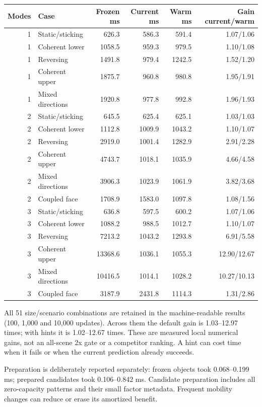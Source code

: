\documentclass[10pt,a4paper]{article}
\newcommand{\toprule}{\hline}\newcommand{\midrule}{\hline}\newcommand{\bottomrule}{\hline}
\begin{document}
\begin{center}\small
\begin{tabular}{rlrrrr}\toprule
Modes & Case & Frozen ms & Current ms & Warm ms & Gain current/warm\\\midrule
1 & Static/sticking & 626.3 & 586.3 & 591.4 & 1.07/1.06 \\
1 & Coherent lower & 1058.5 & 959.3 & 979.5 & 1.10/1.08 \\
1 & Reversing & 1491.8 & 979.4 & 1242.5 & 1.52/1.20 \\
1 & Coherent upper & 1875.7 & 960.8 & 980.8 & 1.95/1.91 \\
1 & Mixed directions & 1920.8 & 977.8 & 992.8 & 1.96/1.93 \\
2 & Static/sticking & 645.5 & 625.4 & 625.1 & 1.03/1.03 \\
2 & Coherent lower & 1112.8 & 1009.9 & 1043.2 & 1.10/1.07 \\
2 & Reversing & 2919.0 & 1001.4 & 1282.9 & 2.91/2.28 \\
2 & Coherent upper & 4743.7 & 1018.1 & 1035.9 & 4.66/4.58 \\
2 & Mixed directions & 3906.3 & 1023.9 & 1061.9 & 3.82/3.68 \\
2 & Coupled face & 1708.9 & 1583.0 & 1097.8 & 1.08/1.56 \\
3 & Static/sticking & 636.8 & 597.5 & 600.2 & 1.07/1.06 \\
3 & Coherent lower & 1088.2 & 988.5 & 1012.7 & 1.10/1.07 \\
3 & Reversing & 7213.2 & 1043.2 & 1293.8 & 6.91/5.58 \\
3 & Coherent upper & 13368.6 & 1036.1 & 1055.3 & 12.90/12.67 \\
3 & Mixed directions & 10416.5 & 1014.1 & 1028.2 & 10.27/10.13 \\
3 & Coupled face & 3187.9 & 2431.8 & 1114.3 & 1.31/2.86 \\
\bottomrule\end{tabular}\end{center}
All 51 size/scenario combinations are retained in the machine-readable results
(100, 1,000 and 10,000 updates). Across them the default gain is 1.03--12.97 times;
with hints it is 1.02--12.67 times. These are measured local numerical gains,
not an all-scene 2x gate or a competitor ranking. A hint can cost time when it
fails or when the current prediction already succeeds.

Preparation is deliberately reported separately: frozen objects took
0.068--0.199 ms;
prepared candidates took 0.106--0.842 ms.
Candidate preparation includes all zero-capacity patterns and their small factor
metadata. Frequent mobility changes can reduce or erase its amortized benefit.
\end{document}
